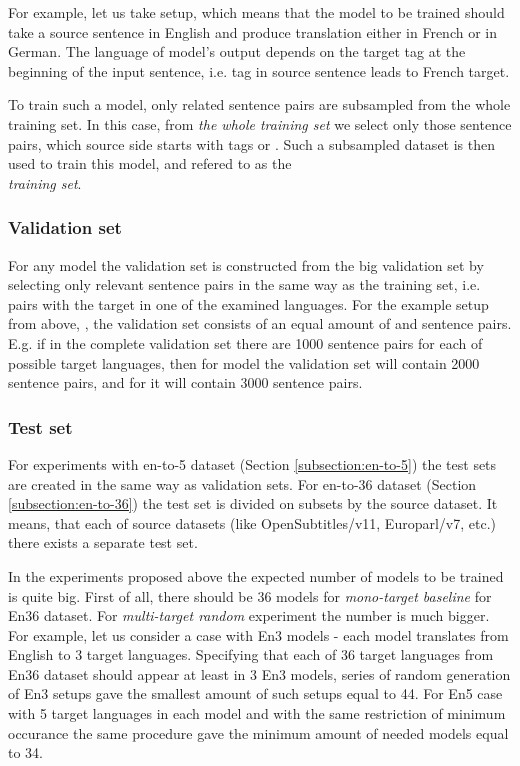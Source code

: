 For example, let us take  setup, which means that
the model to be trained should take a source sentence in English and
produce translation either in French or in German.
The language of model's output depends on the target tag at the beginning
of the input sentence, i.e.  tag in source sentence leads to French
target.

To train such a model, only related sentence pairs are subsampled
from the whole training set.
In this case, from \emph{the whole training set} we select only those sentence
pairs, which source side starts with tags  or .
Such a subsampled dataset is then used to train this model, and refered to 
as the \\ \emph{ training set}.


\subsubsection*{Validation set}

For any model the validation set is constructed from the big validation set
by selecting only relevant sentence pairs in the same way as the training set,
i.e. pairs with the target in one of the examined languages.
For the example setup from above, , the validation set
consists of an equal amount of  and  sentence pairs.
E.g. if in the complete validation set there are 1000 sentence pairs for
each of possible target languages, then for 
model the validation set will contain 2000 sentence pairs, and for
 it will contain 3000 sentence pairs.

\subsubsection*{Test set}

For experiments with \gls{en-to-5} dataset (Section \ref{subsection:en-to-5})
the test sets are created in the same way as validation sets.
For \gls{en-to-36} dataset (Section \ref{subsection:en-to-36})
the test set is divided on subsets by the source dataset.
It means, that each of source datasets (like OpenSubtitles/v11, 
Europarl/v7, etc.) there exists a separate test set.

In the experiments proposed above the expected number of models to be trained is quite big.
First of all, there should be 36 models for \textit{mono-target baseline} for En\to{}36 dataset.
For \textit{multi-target random} experiment the number is much bigger.
For example, let us consider a case with En\to{}3 models - each model translates from English to 
3 target languages. Specifying that each of 36 target languages from En\to{}36 dataset
should appear at least in 3 En\to{}3 models, series of random generation of En\to{}3 setups gave
the smallest amount of such setups equal to 44. For En\to{}5 case with 5 target languages in each
model and with the same restriction of minimum occurance the same procedure gave the
minimum amount of needed models equal to 34.




